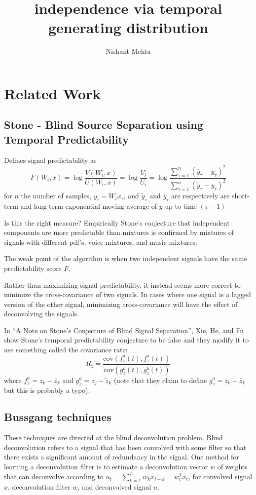 \documentclass{article}
\title{independence via temporal generating distribution}
\author{Nishant Mehta}
\begin{document}
  \maketitle

  \section{Related Work}

  \subsection{Stone - Blind Source Separation using Temporal Predictability}

  Defines signal predictability as
  \[
  F(W_i, x) = \log \frac{V(W_i, x)}{U(W_i,x)} = \log \frac{V_i}{U_i}
  = \log \frac{\sum_{\tau = 1}^n (\bar{y}_{\tau} - y_{\tau})^2}{\sum_{\tau = 1}^n (\tilde{y}_{\tau} - y_{\tau})^2}
  \]
  for $n$ the number of samples, $y_{\tau} = W_i x_{\tau}$, and $\tilde{y}_{\tau}$ and $\bar{y}_{\tau}$ are respectively are short-term and long-term exponential moving average of $y$ up to time $(\tau - 1)$

  Is this the right measure? Empirically Stone's conjecture that independent components are more predictable than mixtures is confirmed by mixtures of signals with different pdf's, voice mixtures, and music mixtures.

  The weak point of the algorithm is when two independent signals have the same predictability score $F$.

  Rather than maximizing signal predictability, it instead seems more correct to minimize the cross-covariance of two signals. In cases where one signal is a lagged version of the other signal, minimizing cross-covariance will have the effect of deconvolving the signals.

  In ``A Note on Stone's Conjecture of Blind Signal Separation'', Xie, He, and Fu show Stone's temporal predictability conjecture to be false and they modify it to use something called the covariance rate:
  \[
  R_z = \frac{\text{cov}(f_z^a(t), f_z^a(t))}{\text{cov}(g_z^b(t), g_z^b(t))}
  \]
  where $f_z^a = z_k - \bar{z}_k$ and $g_z^a = z_j - \tilde{z}_k$ (note that they claim to define $g_z^a = z_k - \bar{z}_k$ but this is probably a typo).

  \subsection{Bussgang techniques}
  These techniques are directed at the blind deconvolution problem. Blind deconvolution refers to a signal that has been convolved with some filter so that there exists a significant amount of redundancy in the signal. One method for learning a deconvolution filter is to estimate a deconvolution vector $w$ of weights that can deconvolve according to $u_t = \sum_{k=1}^L w_k x_{t-k} = w_t^T x_t$, for convolved signal $x$, deconvolution filter $w$, and deconvolved signal $u$.
  
\end{document}
